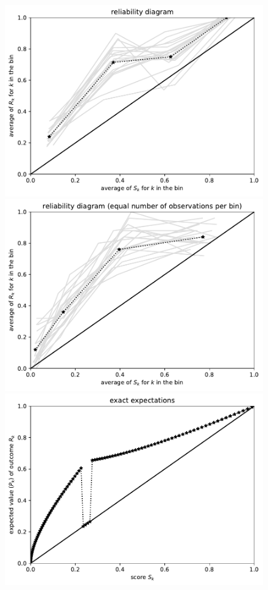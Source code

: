 \documentclass{article}
\begin{document}
\begin{figure}
\begin{centering}
\parbox{\imsize}{\includegraphics[width=\imsize]
                {./codes/unweighted/100_4_1_2/equiprob.pdf}}
\quad\quad
\parbox{\imsize}{\includegraphics[width=\imsize]
                {./codes/unweighted/100_4_1_2/equisamp.pdf}}

\vspace{\vertsep}

\parbox{\imsize}{\includegraphics[width=\imsize]
                {./codes/unweighted/100_4_1_2/exact.pdf}}


\end{centering}
\end{figure}
\end{document}
